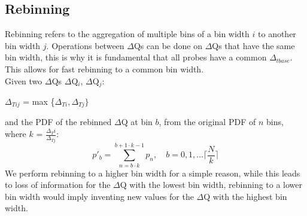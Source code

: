         \subsection{Rebinning}
            Rebinning refers to the aggregation of multiple bins of a bin width $i$ to another bin width $j$. 
            Operations between $\Delta$Qs can be done on $\Delta$Qs that have the same bin width, this is why it is fundamental that all probes have a common $\Delta_{tbase}$. This allows for fast rebinning to a common bin width. \\
            Given two $\Delta$Qs $\Delta$Q$_i$, $\Delta$Q$_j$:
            \begin{center}
                $\Delta_{Tij}$ = max \{$\Delta_{Ti}, \Delta_{Tj} \}$
            \end{center}
            and the PDF of the rebinned $\Delta$Q at bin $b$, from the original PDF of $n$ bins, where $k$ = $\frac{\Delta{_Ti}}{\Delta_{Tj}}$:
            \begin{equation}
                p'_b = \sum_{n=b \cdot k}^{b+ 1 \cdot k - 1} p_n, \quad b=0,1,\dots \lceil \frac{N}{k} \rceil  
            \end{equation}
            We perform rebinning to a higher bin width for a simple reason, while this leads to loss of information for the $\Delta$Q with the lowest bin width, rebinning to a lower bin width would imply inventing new values for the $\Delta$Q with the highest bin width.
